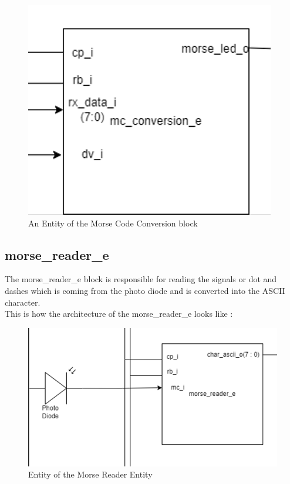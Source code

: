 \documentclass[12pt,a4paper]{article}
\begin{document}
\begin{figure}[H]
\centering
\includegraphics[scale=1.0]{mc_conversion_e.PNG}
\caption{ An Entity of the Morse Code Conversion block}
\label{An Entity of the Morse Code Conversion block}
\end{figure}


\subsection{morse\_reader\_e}
The morse\_reader\_e block is responsible for reading the signals or dot and dashes which is coming from the photo diode and is converted into the ASCII character.\\

This is how the architecture of the morse\_reader\_e looks like :\\
\begin{figure}[H]
\centering
\includegraphics[scale=1.0]{morse_reader_e.PNG}
\caption{Entity of the Morse Reader Entity}
\label{Entity of the Morse Reader Entity}
\end{figure}
\end{document}
